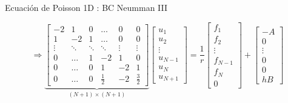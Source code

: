\documentclass{beamer}
\begin{document}
\begin{frame}{Ecuaci\'on de Poisson 1D : BC Neumman III}
\begin{footnotesize}
\[
\Longrightarrow
\underbrace{
\left[
\begin{matrix}
-2 & 1 & 0  & \dots & 0 & 0  \\
1 & -2 & 1  & \dots & 0 & 0 \\
\vdots & \ddots & \ddots & \ddots & \vdots & \vdots \\
0 & \dots & 1 & -2 & 1 & 0 \\
0 & \dots & 0 & 1 & -2 & 1 \\
0 & \dots & 0 & \frac{1}{2} & -2 & \frac{3}{2}        
\end{matrix}
\right] 
}_{(N+1) \times (N+1)}
\left[
\begin{matrix}
u_1 \\ u_2 \\ \vdots \\ u_{N-1} \\ u_N \\ u_{N+1}
\end{matrix}
\right]= 
\frac{1}{r} \left[
\begin{matrix}
f_1 \\ f_2 \\ \vdots \\ f_{N-1} \\ f_N \\ 0
\end{matrix}
\right] +
\left[
\begin{matrix}
-A \\ 0 \\  \vdots \\ 0 \\ 0 \\ hB
\end{matrix}
\right]
\]


\end{footnotesize}

\end{frame}
\end{document}
